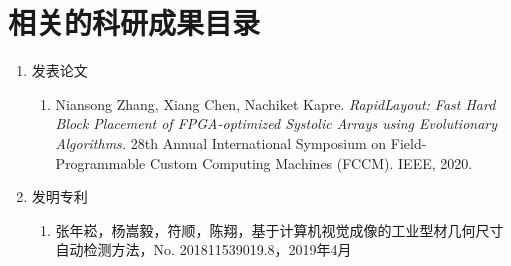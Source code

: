 \chapter{相关的科研成果目录}

\begin{enumerate}
	\item 发表论文
	\begin{enumerate}
		\item Niansong Zhang, Xiang Chen, Nachiket Kapre.
		 \textit{RapidLayout: Fast Hard Block Placement of FPGA-optimized Systolic Arrays using Evolutionary Algorithms.}
		 28th Annual International Symposium on Field-Programmable Custom Computing Machines (FCCM). IEEE, 2020.
	\end{enumerate}
	\item 发明专利
	\begin{enumerate}
		\item 张年崧，杨嵩毅，符顺，陈翔，基于计算机视觉成像的工业型材几何尺寸自动检测方法，No. 201811539019.8，2019年4月
	\end{enumerate}
	
\end{enumerate}